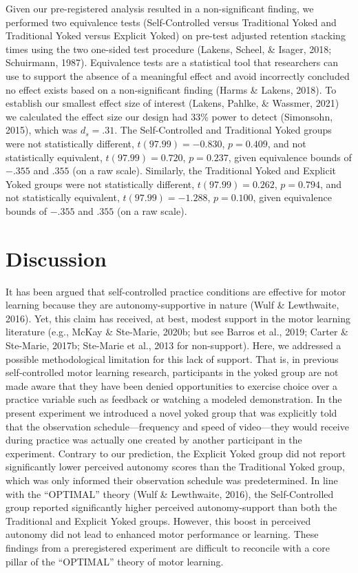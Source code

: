 \documentclass[
  english,
  man, donotrepeattitle,floatsintext]{apa7}
\begin{document}
Given our pre-registered analysis resulted in a non-significant finding, we performed two equivalence tests (Self-Controlled versus Traditional Yoked and Traditional Yoked versus Explicit Yoked) on pre-test adjusted retention stacking times using the two one-sided test procedure (Lakens, Scheel, \& Isager, 2018; Schuirmann, 1987). Equivalence tests are a statistical tool that researchers can use to support the absence of a meaningful effect and avoid incorrectly concluded no effect exists based on a non-significant finding (Harms \& Lakens, 2018). To establish our smallest effect size of interest (Lakens, Pahlke, \& Wassmer, 2021) we calculated the effect size our design had 33\% power to detect (Simonsohn, 2015), which was \(d_{s} = .31\). The Self-Controlled and Traditional Yoked groups were not statistically different, \(t(97.99) = -0.830\), \(p = 0.409\), and not statistically equivalent, \(t(97.99) = 0.720\), \(p = 0.237\), given equivalence bounds of \(-.355\) and \(.355\) (on a raw scale). Similarly, the Traditional Yoked and Explicit Yoked groups were not statistically different, \(t(97.99) = 0.262\), \(p = 0.794\), and not statistically equivalent, \(t(97.99) = -1.288\), \(p = 0.100\), given equivalence bounds of \(-.355\) and \(.355\) (on a raw scale).

\hypertarget{discussion}{%
\section{Discussion}\label{discussion}}

It has been argued that self-controlled practice conditions are effective for motor learning because they are autonomy-supportive in nature (Wulf \& Lewthwaite, 2016). Yet, this claim has received, at best, modest support in the motor learning literature (e.g., McKay \& Ste-Marie, 2020b; but see Barros et al., 2019; Carter \& Ste-Marie, 2017b; Ste-Marie et al., 2013 for non-support). Here, we addressed a possible methodological limitation for this lack of support. That is, in previous self-controlled motor learning research, participants in the yoked group are not made aware that they have been denied opportunities to exercise choice over a practice variable such as feedback or watching a modeled demonstration. In the present experiment we introduced a novel yoked group that was explicitly told that the observation schedule---frequency and speed of video---they would receive during practice was actually one created by another participant in the experiment. Contrary to our prediction, the Explicit Yoked group did not report significantly lower perceived autonomy scores than the Traditional Yoked group, which was only informed their observation schedule was predetermined. In line with the ``OPTIMAL'' theory (Wulf \& Lewthwaite, 2016), the Self-Controlled group reported significantly higher perceived autonomy-support than both the Traditional and Explicit Yoked groups. However, this boost in perceived autonomy did not lead to enhanced motor performance or learning. These findings from a preregistered experiment are difficult to reconcile with a core pillar of the ``OPTIMAL'' theory of motor learning.
\end{document}
